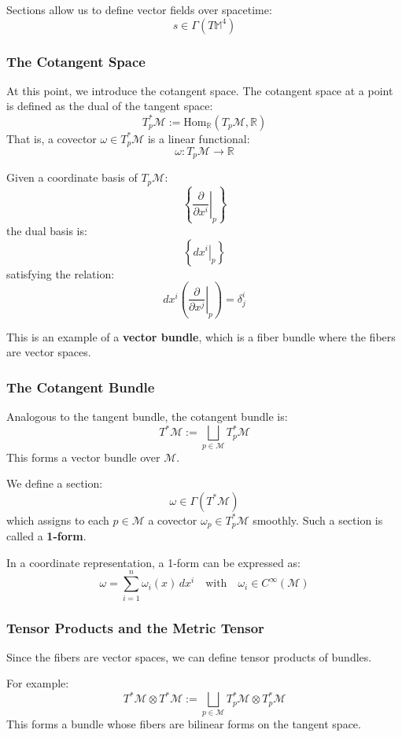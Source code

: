 Sections allow us to define vector fields over spacetime:
\[
s \in \Gamma(T\mathbb{M}^4)
\]

\subsubsection*{The Cotangent Space}

At this point, we introduce the cotangent space.  
The cotangent space at a point is defined as the dual of the tangent space:
\[
T_p^*\mathcal{M} := \text{Hom}_\mathbb{R}(T_p \mathcal{M}, \mathbb{R})
\]
That is, a covector $\omega \in T_p^*\mathcal{M}$ is a linear functional:
\[
\omega: T_p \mathcal{M} \to \mathbb{R}
\]

Given a coordinate basis of $T_p \mathcal{M}$:
\[
\left\{ \left. \frac{\partial}{\partial x^i} \right|_p \right\}
\]
the dual basis is:
\[
\left\{ \left. dx^i \right|_p \right\}
\]
satisfying the relation:
\[
dx^i\left( \left. \frac{\partial}{\partial x^j} \right|_p \right) = \delta^i_j
\]


This is an example of a \textbf{vector bundle}, which is a fiber bundle where the fibers are vector spaces.



\subsubsection*{The Cotangent Bundle}

Analogous to the tangent bundle, the cotangent bundle is:
\[
T^*\mathcal{M} := \bigsqcup_{p \in \mathcal{M}} T_p^* \mathcal{M}
\]
This forms a vector bundle over $\mathcal{M}$.

We define a section:
\[
\omega \in \Gamma(T^* \mathcal{M})
\]
which assigns to each $p \in \mathcal{M}$ a covector $\omega_p \in T_p^*\mathcal{M}$ smoothly. Such a section is called a \textbf{1-form}.

In a coordinate representation, a 1-form can be expressed as:
\[
\omega = \sum_{i=1}^n \omega_i(x) \, dx^i
\quad \text{with} \quad \omega_i \in C^\infty(\mathcal{M})
\]

\subsubsection*{Tensor Products and the Metric Tensor}

Since the fibers are vector spaces, we can define tensor products of bundles.

For example:
\[
T^*\mathcal{M} \otimes T^*\mathcal{M} := \bigsqcup_{p \in \mathcal{M}} T_p^*\mathcal{M} \otimes T_p^*\mathcal{M}
\]
This forms a bundle whose fibers are bilinear forms on the tangent space.

